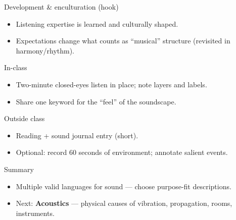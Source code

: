 \documentclass[aspectratio=169]{beamer}
\begin{document}
\begin{frame}{Development \& enculturation (hook)}
  \begin{itemize}
    \item Listening expertise is learned and culturally shaped.
    \item Expectations change what counts as ``musical'' structure (revisited in harmony/rhythm).
  \end{itemize}
\end{frame}

\begin{frame}{In-class}
  \begin{itemize}
    \item Two-minute closed-eyes listen in place; note layers and labels.
    \item Share one keyword for the ``feel'' of the soundscape.
  \end{itemize}
\end{frame}

\begin{frame}{Outside class}
  \begin{itemize}
    \item Reading + sound journal entry (short).
    \item Optional: record 60 seconds of environment; annotate salient events.
  \end{itemize}
\end{frame}

\begin{frame}{Summary}
  \begin{itemize}
    \item Multiple valid languages for sound — choose purpose-fit descriptions.
    \item Next: \textbf{Acoustics} — physical causes of vibration, propagation, rooms, instruments.
  \end{itemize}
\end{frame}
\end{document}
